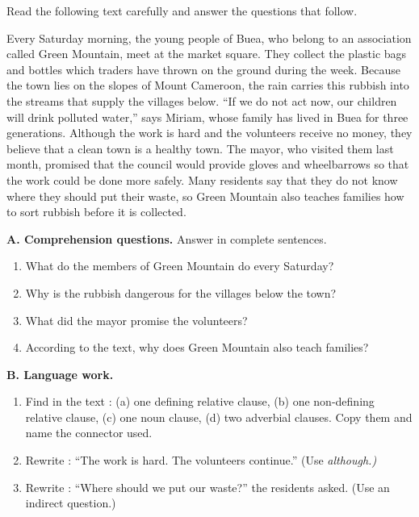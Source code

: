 \documentclass[11pt]{article}
\newcommand{\eng}[1]{\ifmmode\text{\textit{#1}}\else\begingroup\selectlanguage{english}\itshape #1\endgroup\fi}
\begin{document}
\begin{exercice}
Read the following text carefully and answer the questions that follow.

\begin{textebox}
Every Saturday morning, the young people of Buea, who belong to an association called Green Mountain, meet at the market square. They collect the plastic bags and bottles which traders have thrown on the ground during the week. Because the town lies on the slopes of Mount Cameroon, the rain carries this rubbish into the streams that supply the villages below. “If we do not act now, our children will drink polluted water,” says Miriam, whose family has lived in Buea for three generations. Although the work is hard and the volunteers receive no money, they believe that a clean town is a healthy town. The mayor, who visited them last month, promised that the council would provide gloves and wheelbarrows so that the work could be done more safely. Many residents say that they do not know where they should put their waste, so Green Mountain also teaches families how to sort rubbish before it is collected.
\end{textebox}

\textbf{A. Comprehension questions.} Answer in complete sentences.
\begin{enumerate}
\item What do the members of Green Mountain do every Saturday?
\item Why is the rubbish dangerous for the villages below the town?
\item What did the mayor promise the volunteers?
\item According to the text, why does Green Mountain also teach families?
\end{enumerate}

\textbf{B. Language work.}
\begin{enumerate}
\item Find in the text : (a) one defining relative clause, (b) one non-defining relative clause, (c) one noun clause, (d) two adverbial clauses. Copy them and name the connector used.
\item Rewrite : “The work is hard. The volunteers continue.” (Use \eng{although}.)
\item Rewrite : “Where should we put our waste?” the residents asked. (Use an indirect question.)
\end{enumerate}
\end{exercice}
\end{document}
